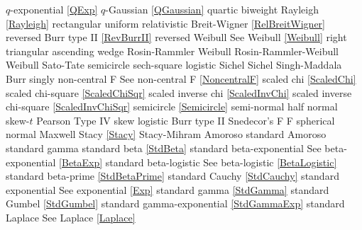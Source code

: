 %
$q$-exponential					\dotfill	\eqref{QExp}						\ncite	%
$q$-Gaussian					\dotfill	\eqref{QGaussian}					\ncite	%
quartic							\dotfill	biweight							\ncite
%
Rayleigh  						\dotfill	\eqref{Rayleigh}					\ncite	%
rectangular						\dotfill	uniform 							\ncite	%
relativistic Breit-Wigner		\dotfill	\eqref{RelBreitWigner}				\ncite	%
reversed Burr type II			\dotfill	\eqref{RevBurrII} 					\ncite	%
reversed Weibull				\dotfill	See Weibull \eqref{Weibull}			\ncite	%
right triangular				\dotfill	ascending wedge 					\ncite	%
Rosin-Rammler 					\dotfill	Weibull								   		%
Rosin-Rammler-Weibull 			\dotfill	Weibull								\ncite	%
%
Sato-Tate						\dotfill	semicircle 							\ncite	%
sech-square 					\dotfill	logistic							\ncite	%
Sichel							\dotfill	Sichel								\ncite	
Singh-Maddala 					\dotfill	Burr 								\ncite	%
singly non-central F       		\dotfill	See non-central F  \eqref{NoncentralF}	\ncite 
scaled chi						\dotfill	\eqref{ScaledChi}					\ncite	%
scaled chi-square 				\dotfill	\eqref{ScaledChiSqr}				\ncite	%
scaled inverse chi 				\dotfill	\eqref{ScaledInvChi}				\ncite	%
scaled inverse chi-square 		\dotfill	\eqref{ScaledInvChiSqr}				 	%
semicircle						\dotfill	\eqref{Semicircle}					\ncite	%
semi-normal 					\dotfill	half normal 						\ncite	%
skew-$t$						\dotfill	Pearson Type IV 					\ncite	%
skew logistic					\dotfill	Burr type II 						\ncite	%
Snedecor's F  					\dotfill	F 									\ncite	%
spherical normal				\dotfill	Maxwell								\ncite	%
Stacy 							\dotfill	\eqref{Stacy} 						\ncite	%
Stacy-Mihram					\dotfill	Amoroso								\ncite	%
standard Amoroso				\dotfill	standard gamma 						\ncite	%
standard beta					\dotfill	\eqref{StdBeta} 					\ncite	%
standard beta-exponential		\dotfill	See beta-exponential \eqref{BetaExp}	\ncite	%
standard beta-logistic			\dotfill	See beta-logistic \eqref{BetaLogistic}		\ncite	%
standard beta-prime				\dotfill	\eqref{StdBetaPrime}				\ncite	%
standard Cauchy					\dotfill	\eqref{StdCauchy} 					\ncite	%
standard exponential			\dotfill	See exponential \eqref{Exp} 		\ncite	%
standard gamma 					\dotfill	\eqref{StdGamma} 					\ncite	%
standard Gumbel 				\dotfill	\eqref{StdGumbel} 					\ncite	%
standard gamma-exponential		\dotfill	\eqref{StdGammaExp} 				\ncite	%
standard Laplace				\dotfill	See Laplace \eqref{Laplace}			\ncite	%

